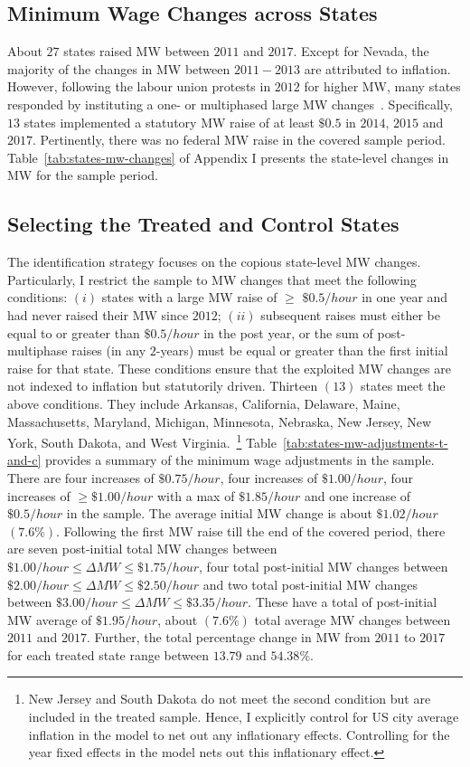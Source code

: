 \documentclass{C:/Users/david/OneDrive/Documents/ULMS/PhD/Thesis/chapter3/src/climate_change/latex/Economic_Journal/OUP-EJ}
\begin{document}
    \subsection{Minimum Wage Changes across States}\label{subsec:minimum-wage-changes-across-states}
    About $27$ states raised MW between $2011$ and $2017$. Except for Nevada, the majority of the changes in MW between $2011-2013$ are attributed to inflation. However, following the labour union protests in $2012$ for higher MW, many states responded by instituting a one- or multiphased large MW changes~\citep{lathrop2021raises}. Specifically, $13$ states implemented a statutory MW raise of at least $\$0.5$ in $2014$, $2015$ and $2017$. Pertinently, there was no federal MW raise in the covered sample period. Table~\ref{tab:states-mw-changes} of Appendix I presents the state-level changes in MW for the sample period.

    \subsection{Selecting the Treated and Control States}\label{subsec:selecting-the-treated-and-control-states}
    The identification strategy focuses on the copious state-level MW changes. Particularly, I restrict the sample to MW changes that meet the following conditions: $(i)$ states with a large MW raise of $\geq$ $\$0.5/hour$ in one year and had never raised their MW since $2012$; $(ii)$ subsequent raises must either be equal to or greater than $\$0.5/hour$ in the post year, or the sum of post-multiphase raises (in any $2$-years) must be equal or greater than the first initial raise for that state. These conditions ensure that the exploited MW changes are not indexed to inflation but statutorily driven. Thirteen $(13)$ states meet the above conditions. They include Arkansas, California, Delaware, Maine, Massachusetts, Maryland, Michigan, Minnesota, Nebraska, New Jersey, New York, South Dakota, and West Virginia.~\footnote{\tiny New Jersey and South Dakota do not meet the second condition but are included in the treated sample. Hence, I explicitly control for US city average inflation in the model to net out any inflationary effects. Controlling for the year fixed effects in the model nets out this inflationary effect.} Table~\ref{tab:states-mw-adjustments-t-and-c} provides a summary of the minimum wage adjustments in the sample. There are four increases of $\$0.75/hour$, four increases of $\$1.00/hour$, four increases of $\geq \$1.00/hour$ with a max of $\$1.85/hour$ and one increase of $\$0.5/hour$ in the sample. The average initial MW change is about $\$1.02/hour$ $(7.6\%)$. Following the first MW raise till the end of the covered period, there are seven post-initial total MW changes between $\$1.00/hour \leq \Delta MW \leq \$1.75/hour$, four total post-initial MW changes between $\$2.00/hour \leq \Delta MW \leq \$2.50/hour$ and two total post-initial MW changes between $\$3.00/hour \leq \Delta MW \leq \$3.35/hour$. These have a total of post-initial MW average of $\$1.95/hour$, about $(7.6\%)$ total average MW changes between $2011$ and $2017$. Further, the total percentage change in MW from $2011$ to $2017$ for each treated state range between $13.79$ and $54.38\%$.
    
\end{document}
